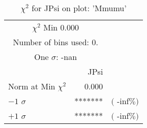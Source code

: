  \begin{table}[h!]\centering
 {\small{
 \begin{tabular}{||l||r||r||}
 \hline
 \hline
\multicolumn{2}{||c||}{$\chi^{2}$ Min   0.000} & \\
 \multicolumn{2}{||c||}{Number of bins used:   0.} & \\
\multicolumn{2}{||c||}{One $\sigma$:     -nan} & \\
 \hline
 \hline
    & JPsi & \\
Norm at Min $\chi^{2}$  &   0.000 & \\
$-1$ $\sigma$ & *******  &  $($ -inf$\%)$  \\
$+1$ $\sigma$ & *******  &  $($ -inf$\%)$  \\
 \hline
 \hline
 \end{tabular}
 \caption{$\chi^{2}$ for JPsi on plot: 'Mmumu'}
 \label{tab-chijpsi}
 }}
 \end{table}
 \endinput
